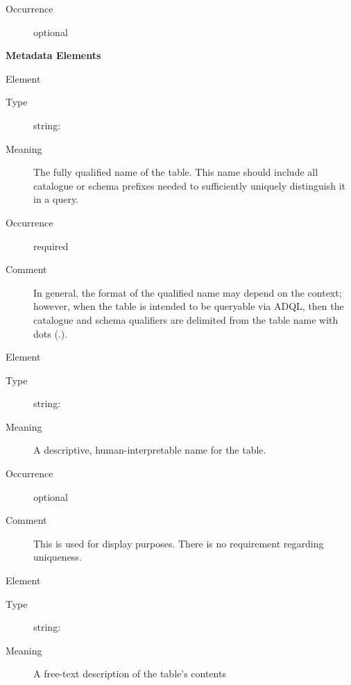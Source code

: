 \documentclass[11pt,a4paper]{ivoa}
\begin{document}
\begin{generated}
\begin{bigdescription}
\begin{description}
\item[Occurrence] optional
\end{description}


\end{bigdescription}\endgroup



\vspace{0.5ex}\noindent\textbf{ Metadata Elements}

\begingroup\small\begin{bigdescription}\item[Element \xmlel{name}]
\begin{description}
\item[Type] string: 
\item[Meaning] 
                  The fully qualified name of the table.  This name 
                  should include all catalogue or schema prefixes
                  needed to sufficiently uniquely distinguish it in a
                  query.  
               
\item[Occurrence] required
\item[Comment] 
                  In general, the format of the qualified name may
                  depend on the context; however, when the
                  table is intended to be queryable via ADQL, then the
                  catalogue and schema qualifiers are delimited from the
                  table name with dots (.).  
               

\end{description}
\item[Element \xmlel{title}]
\begin{description}
\item[Type] string: 
\item[Meaning] 
                  A descriptive, human-interpretable name for the table.
               
\item[Occurrence] optional
\item[Comment] 
                  This is used for display purposes.  There is no requirement
                  regarding uniqueness.  
               

\end{description}
\item[Element \xmlel{description}]
\begin{description}
\item[Type] string: 
\item[Meaning] 
                  A free-text description of the table's contents
               

\end{description}
\end{bigdescription}
\end{generated}
\end{document}
